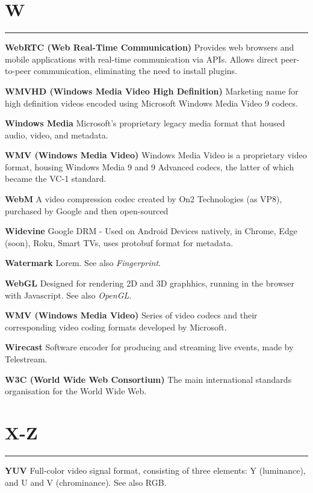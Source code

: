 \section{W}
\hrule

\smallskip
\textbf{WebRTC (Web Real-Time Communication)}
Provides web browsers and mobile applications with real-time communication via APIs. Allows direct peer-to-peer communication, eliminating the need to install plugins.

\smallskip
\textbf{WMVHD (Windows Media Video High Definition)}
Marketing name for high definition videos encoded using Microsoft Windows Media Video 9 codecs.

\smallskip
\textbf{Windows Media}
Microsoft's proprietary legacy media format that housed audio, video, and metadata.

\smallskip
\textbf{WMV (Windows Media Video)}
Windows Media Video is a proprietary video format, housing Windows Media 9 and 9 Advanced codecs, the latter of which became the VC-1 standard.

\smallskip
\textbf{WebM}
A video compression codec created by On2 Technologies (as VP8), purchased by Google and then open-sourced

\smallskip
\textbf{Widevine}
Google DRM - Used on Android Devices natively, in Chrome, Edge (soon), Roku, Smart TVs, uses protobuf format for metadata.

\smallskip
\textbf{Watermark}
Lorem. See also \textit{Fingerprint}.

\smallskip
\textbf{WebGL}
Designed for rendering 2D and 3D graphhics, running in the browser with Javascript. See also \textit{OpenGL}.

\smallskip
\textbf{WMV (Windows Media Video)}
Series of video codecs and their corresponding video coding formats developed by Microsoft.

\smallskip
\textbf{Wirecast}
Software encoder for producing and streaming live events, made by Telestream.

\smallskip
\textbf{W3C (World Wide Web Consortium)}
The main international standards organisation for the World Wide Web.

\section{X-Z}
\hrule

\smallskip
\textbf{YUV}
Full-color video signal format, consisting of three elements: Y (luminance), and U and V (chrominance). See also RGB.
